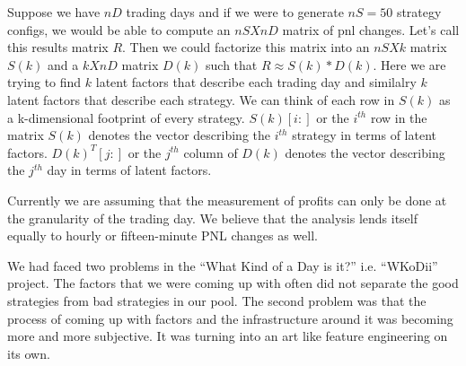 \documentclass[a4paper]{article}
\begin{document}
Suppose we have $nD$ trading days and if we were to generate $nS =
50$ strategy configs, we would be able to compute an $nS X nD$ 
matrix of pnl changes. Let's call this results matrix $R$. 
Then we could factorize this matrix into an $nS X k$ matrix $S(k)$ 
and a $k X nD$ matrix $D(k)$ such that $R \approx S(k) * D(k)$. 
Here we are trying to find $k$ latent factors that describe 
each trading day and similalry $k$ latent factors that describe 
each strategy.
We can think of each row in $S(k)$ as a k-dimensional footprint of every
strategy. $S(k)[i:]$ or the $i^{th}$ row in the matrix $S(k)$ denotes
the vector describing the $i^{th}$ strategy in terms of latent
factors. $D(k)^T[j:]$ or the $j^{th}$ column of $D(k)$ denotes the
vector describing the $j^{th}$ day in terms of latent factors.

Currently we are assuming that the measurement of profits can
only be done at the granularity of the trading day. We believe that
the analysis lends itself equally to hourly or fifteen-minute PNL
changes as well.

We had faced two problems in the ``What Kind of a Day is it?''
i.e. ``WKoDii'' project. The factors that we were coming up with often
did not separate the good strategies from bad strategies in our
pool. The second problem was that the process of coming up with
factors and the infrastructure around it was becoming more and more
subjective. It was turning into an art like feature engineering on its
own.
\end{document}
